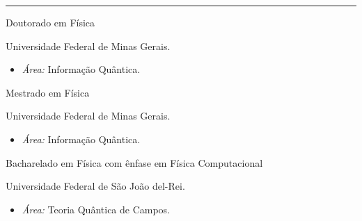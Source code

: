\documentclass[a4paper,10pt]{article}
\newlength{\cvcolumngapwidth}
\newlength{\cvleftcolumnwidth}
\newlength{\cvrightcolumnwidth}
\newcommand{\cvsectionstyle}[1]{{\normalsize\cvsectionfont\textcolor{cvsectioncolor}{#1}}}
\newcommand{\cvtitlestyle}[1]{{\normalsize\cvtitlefont\textcolor{cvtitlecolor}{#1}}}
\newcommand{\cvdurationstyle}[1]{{\normalsize\cvdurationfont\textcolor{cvdurationcolor}{#1}}}
\newlength{\cvafteritemskipamount}
\newlength{\cvaftersectionskipamount}
\newlength{\cvaftertitleskipamount}
\newlength{\cvparskip}
\newcommand{\cvsection}[1]{
    \begin{minipage}[t]{\cvleftcolumnwidth}
        \raggedleft\cvsectionstyle{#1}
    \end{minipage}%
    \hspace{\cvcolumngapwidth}%
    \begin{minipage}[t]{\cvrightcolumnwidth}
        \textcolor{cvrulecolor}{\rule{\cvrightcolumnwidth}{0.5mm}}
    \end{minipage}
    \vspace{\cvaftersectionskipamount}}
\newcommand{\cvitem}[2]{
    \begin{minipage}[t]{\cvleftcolumnwidth}
        \raggedleft #1
    \end{minipage}%
    \hspace{\cvcolumngapwidth}%
    \begin{minipage}[t]{\cvrightcolumnwidth}
        \setlength{\parskip}{\cvparskip} #2
    \end{minipage}
    \vspace{\cvafteritemskipamount}}
\newcommand{\cvtitle}[1]{
    \cvtitlestyle{#1}
    \vspace{\cvaftertitleskipamount}
    \vspace{-\cvparskip}}
\begin{document}
% 
% 
% 

\cvsection{Formação Acadêmica}
\cvitem{\cvdurationstyle{2016 - Presente}}
    {\cvtitle{Doutorado em Física}

    Universidade Federal de Minas Gerais.
    
        \begin{itemize}[leftmargin=*]
        \item \textit{Área:} Informação Quântica.
        \end{itemize}
    }
\cvitem{\cvdurationstyle{2014 - 2016}}
    {\cvtitle{Mestrado em Física}

    Universidade Federal de Minas Gerais.
    
    \begin{itemize}[leftmargin=*]
        \item \textit{Área:} Informação Quântica.
        \end{itemize}
    }
\cvitem{\cvdurationstyle{2010 - 2013}}
    {\cvtitle{Bacharelado em Física com ênfase em Física Computacional}

    Universidade Federal de São João del-Rei.
    
    \begin{itemize}[leftmargin=*]
    \item \textit{Área:} Teoria Quântica de Campos.
    \end{itemize}
    }
\end{document}
